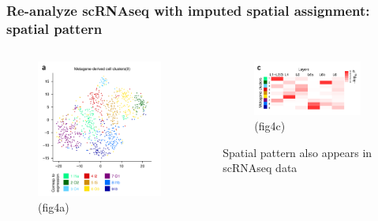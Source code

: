 \documentclass{beamer}
\begin{document}
  \begin{frame}
  \frametitle{Re-analyze scRNAseq with imputed spatial assignment: spatial pattern}
  \begin{columns}
  \begin{column}{0.5\textwidth}
    \begin{figure}
      \centering
      \includegraphics[width=0.9\textwidth]{glu_tsne} (fig4a)
    \end{figure}
  \end{column}
  \begin{column}{0.5\textwidth}
    \begin{figure}
      \centering
      \includegraphics[width=0.9\textwidth]{glu_ana} (fig4c)
    \end{figure}
    Spatial pattern also appears in scRNAseq data
  \end{column}
  \end{columns}
  \end{frame}
\end{document}
